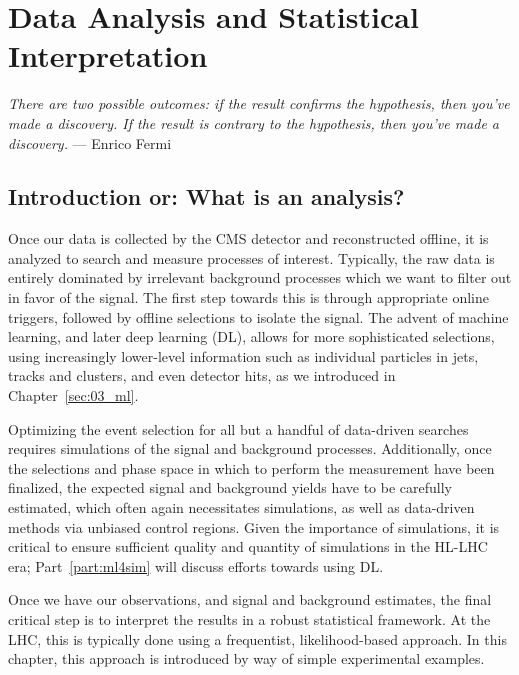\chapter{Data Analysis and Statistical Interpretation}
\label{sec:03_stats}

\begin{center}
  \centering
  \noindent
  \textit{There are two possible outcomes: if the result confirms the hypothesis, then you've made a discovery. If the result is contrary to the hypothesis, then you've made a discovery.} --- Enrico Fermi
\end{center}

\section{Introduction or: What is an analysis?}

Once our data is collected by the CMS detector and reconstructed offline, it is analyzed to search and measure processes of interest.
Typically, the raw data is entirely dominated by irrelevant background processes which we want to filter out in favor of the signal.
The first step towards this is through appropriate online triggers, followed by offline selections to isolate the signal.
The advent of machine learning, and later deep learning (DL), allows for more sophisticated selections, using increasingly lower-level information such as individual particles in jets, tracks and clusters, and even detector hits, as we introduced in Chapter~\ref{sec:03_ml}.

Optimizing the event selection for all but a handful of data-driven searches requires simulations of the signal and background processes.
Additionally, once the selections and phase space in which to perform the measurement have been finalized, the expected signal and background yields have to be carefully estimated, which often again necessitates simulations, as well as data-driven methods via unbiased control regions.
Given the importance of simulations, it is critical to ensure sufficient quality and quantity of simulations in the HL-LHC era; Part~\ref{part:ml4sim} will discuss efforts towards using DL.

Once we have our observations, and signal and background estimates, the final critical step is to interpret the results in a robust statistical framework.
At the LHC, this is typically done using a frequentist, likelihood-based approach.
In this chapter, this approach is introduced by way of simple experimental examples.

